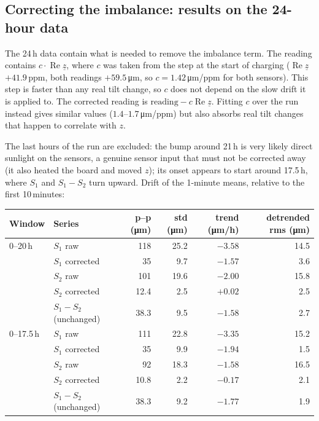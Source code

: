 \documentclass[11pt,a4paper]{article}
\begin{document}
\subsection{Correcting the imbalance: results on the 24-hour data}

The 24\,h data contain what is needed to remove the imbalance term.  The
reading contains $c\cdot\operatorname{Re}\underline{z}$, where $c$ was taken
from the step at the start of charging ($\operatorname{Re}\underline{z}$
$+41.9$\,ppm, both readings $+59.5$\,\si{\micro\metre}, so
$c=1.42$\,\si{\micro\metre}/ppm for both sensors).  This step is faster than
any real tilt change, so $c$ does not depend on the slow drift it is
applied to.  The corrected reading is
$\text{reading}-c\operatorname{Re}\underline{z}$.  Fitting $c$ over the run
instead gives similar values ($1.4$--$1.7$\,\si{\micro\metre}/ppm) but also
absorbs real tilt changes that happen to correlate with $z$.

The last hours of the run are excluded: the bump around 21\,h is very likely
direct sunlight on the sensors, a genuine sensor input that must not be
corrected away (it also heated the board and moved $z$); its onset appears
to start around 17.5\,h, where $S_1$ and $S_1-S_2$ turn upward.  Drift of the
1-minute means, relative to the first 10\,minutes:

\begin{center}
\small
\begin{tabular}{@{}llrrrr@{}}
\toprule
Window & Series & p--p (\si{\micro\metre}) & std (\si{\micro\metre}) & trend (\si{\micro\metre}/h) & detrended rms (\si{\micro\metre}) \\
\midrule
0--20\,h   & $S_1$ raw       & 118 & 25.2 & $-3.58$ & 14.5 \\
           & $S_1$ corrected & 35  & 9.7  & $-1.57$ & 3.6 \\
           & $S_2$ raw       & 101 & 19.6 & $-2.00$ & 15.8 \\
           & $S_2$ corrected & 12.4 & 2.5 & $+0.02$ & 2.5 \\
           & $S_1-S_2$ (unchanged) & 38.3 & 9.5 & $-1.58$ & 2.7 \\
\midrule
0--17.5\,h & $S_1$ raw       & 111 & 22.8 & $-3.35$ & 15.2 \\
           & $S_1$ corrected & 35  & 9.9  & $-1.94$ & 1.5 \\
           & $S_2$ raw       & 92  & 18.3 & $-1.58$ & 16.5 \\
           & $S_2$ corrected & 10.8 & 2.2 & $-0.17$ & 2.1 \\
           & $S_1-S_2$ (unchanged) & 38.3 & 9.2 & $-1.77$ & 1.9 \\
\bottomrule
\end{tabular}
\end{center}
\end{document}
